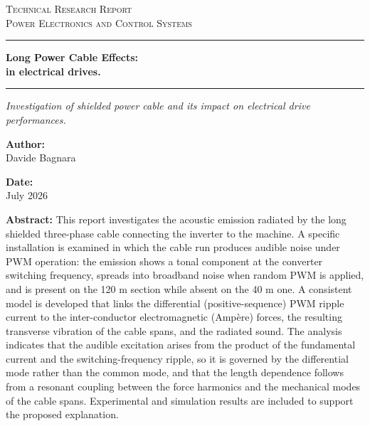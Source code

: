 \documentclass[11pt,a4paper,oneside]{book}
\newcommand{\DocCategory}{Technical Research Report}
\newcommand{\DocField}{Power Electronics and Control Systems}
\newcommand{\DocTitle}{%
	{\fontsize{20}{24}\selectfont\bfseries Long Power Cable Effects:} \\[16pt]
	{\fontsize{16}{20}\selectfont\bfseries in electrical drives.}
}
\newcommand{\DocSubtitle}{%
	Investigation of shielded power cable and its impact on electrical drive performances. 
}
\newcommand{\DocAuthor}{Davide Bagnara}
\newcommand{\DocDate}{July 2026}
\newcommand{\DocAbstract}{%
	This report investigates the acoustic emission radiated by the long shielded three-phase cable connecting the inverter to the machine. A specific installation is examined in which the cable run produces audible noise under PWM operation: the emission shows a tonal component at the converter switching frequency, spreads into broadband noise when random PWM is applied, and is present on the 120 m section while absent on the 40 m one.
	A consistent model is developed that links the differential (positive-sequence) PWM ripple current to the inter-conductor electromagnetic (Ampère) forces, the resulting transverse vibration of the cable spans, and the radiated sound. The analysis indicates that the audible excitation arises from the product of the fundamental current and the switching-frequency ripple, so it is governed by the differential mode rather than the common mode, and that the length dependence follows from a resonant coupling between the force harmonics and the mechanical modes of the cable spans. Experimental and simulation results are included to support the proposed explanation.
}
\begin{document}
	\titlepage
	\begin{center}
		{\Large\scshape \DocCategory}\\[8pt]
		{\large\scshape \DocField}
	\end{center}
	
	\vspace{36pt}
	\noindent\rule{\linewidth}{0.8pt}
	
	\vspace{16pt}
	\begin{center}
		\DocTitle
	\end{center}
	
	\vspace{4pt}
	\noindent\rule{\linewidth}{2.2pt}
	
	\begin{center}
		\begin{onehalfspace}
			{\large\itshape \DocSubtitle}
		\end{onehalfspace}
	\end{center}
	
	\vspace{18pt}
	
	\begin{minipage}{0.92\linewidth}
		\noindent
		\begin{minipage}[t]{0.48\linewidth}
			\textbf{Author:}\\[2pt]
			\DocAuthor
		\end{minipage}%
		\hfill
		\begin{minipage}[t]{0.48\linewidth}
			\raggedleft
			\textbf{Date:}\\[2pt]
			\DocDate
		\end{minipage}
	\end{minipage}
	\vspace{36pt}
	
	\begin{center}
		\begin{minipage}{0.85\linewidth}
			\footnotesize 
			\begin{onehalfspace}
				\textbf{Abstract:} \DocAbstract
			\end{onehalfspace}
		\end{minipage}
	\end{center}
	
\end{document}
